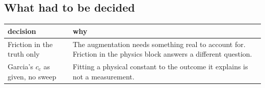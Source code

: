 \documentclass[12pt]{article}
\newcommand{\cc}{c_{\mathrm{c}}}
\newcommand{\panel}[1]{\subsection*{\Large #1}\vspace{1mm}}
\begin{document}
\newpage
\panel{What had to be decided}

\begin{tabular}{@{}L{0.33\textwidth}L{0.55\textwidth}@{}}
\toprule
decision & why \\
\midrule
Friction in the truth only
& The augmentation needs something real to account for. Friction in the physics
block answers a different question. \\[2mm]
Garcia's $\cc$ as given, no sweep
& Fitting a physical constant to the outcome it explains is not a measurement. \\
\bottomrule
\end{tabular}
\end{document}
